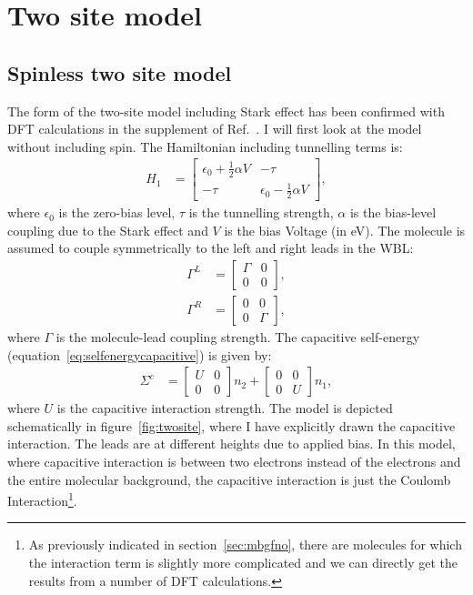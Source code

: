 \section{Two site model} 
\label{sec:twosite}
\subsection{Spinless two site model}
The form of the two-site model including Stark effect has been confirmed with DFT calculations in the supplement of Ref.~\cite{perrinnano}. I  will first look at the model without including spin. The Hamiltonian including tunnelling terms is:
\begin{align}
H_1 &= \begin{bmatrix} \epsilon_0 + \frac{1}{2} \alpha V & -\tau \\
-\tau & \epsilon_0 - \frac{1}{2} \alpha V\end{bmatrix},
\label{eq:spinlesshamiltonian}
\end{align}
where $\epsilon_0$ is the zero-bias level, $\tau$ is the tunnelling strength, $\alpha$ is the bias-level coupling due to the Stark effect and $V$ is the bias Voltage (in eV). The molecule is assumed to couple symmetrically to the left and right leads in the WBL:
\begin{align*}
\Gamma^L &= \begin{bmatrix} \Gamma & 0 \\ 0 & 0 \end{bmatrix},\\ \Gamma^R &= \begin{bmatrix} 0 & 0 \\ 0 & \Gamma \end{bmatrix},
\end{align*}
where $\Gamma$ is the molecule-lead coupling strength. The capacitive self-energy (equation~\ref{eq:selfenergycapacitive}) is given by:
\begin{align*}
\Sigma^c &= \begin{bmatrix} U & 0 \\ 0 & 0 \end{bmatrix} n_2 + \begin{bmatrix} 0 & 0 \\ 0 & U \end{bmatrix} n_1,
\end{align*}
where $U$ is the capacitive interaction strength.  The model is depicted schematically in figure~\ref{fig:twosite}, where I have explicitly drawn the capacitive interaction. The leads are at different heights due to applied bias. In this model, where capacitive interaction is between two electrons instead of the electrons and the entire molecular background, the capacitive interaction is just the Coulomb Interaction\footnote{As previously indicated in section~\ref{sec:mbgfno}, there are molecules for which the interaction term is slightly more complicated and we can directly get the results from a number of DFT calculations.}.


